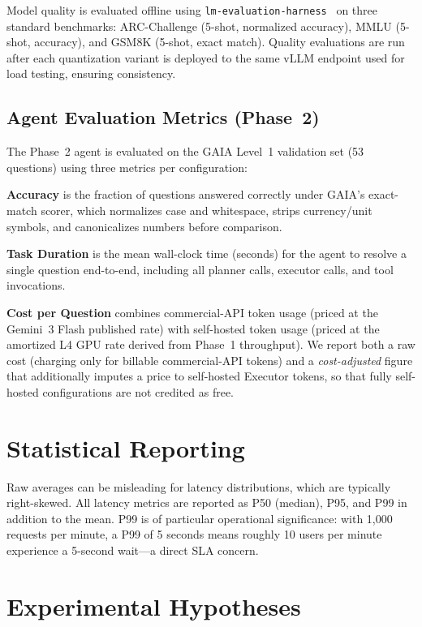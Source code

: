 \documentclass[a4paper,12pt]{report}
\begin{document}
Model quality is evaluated offline using \texttt{lm-evaluation-harness}~\cite{lmeval} on three standard benchmarks: ARC-Challenge (5-shot, normalized accuracy), MMLU (5-shot, accuracy), and GSM8K (5-shot, exact match). Quality evaluations are run after each quantization variant is deployed to the same vLLM endpoint used for load testing, ensuring consistency.

\subsection{Agent Evaluation Metrics (Phase~2)}

The Phase~2 agent is evaluated on the GAIA Level~1 validation set (53 questions) using three metrics per configuration:

\textbf{Accuracy} is the fraction of questions answered correctly under GAIA's exact-match scorer, which normalizes case and whitespace, strips currency/unit symbols, and canonicalizes numbers before comparison.

\textbf{Task Duration} is the mean wall-clock time (seconds) for the agent to resolve a single question end-to-end, including all planner calls, executor calls, and tool invocations.

\textbf{Cost per Question} combines commercial-API token usage (priced at the Gemini~3 Flash published rate) with self-hosted token usage (priced at the amortized L4 GPU rate derived from Phase~1 throughput). We report both a raw cost (charging only for billable commercial-API tokens) and a \emph{cost-adjusted} figure that additionally imputes a price to self-hosted Executor tokens, so that fully self-hosted configurations are not credited as free.

\section{Statistical Reporting}

Raw averages can be misleading for latency distributions, which are typically right-skewed. All latency metrics are reported as P50 (median), P95, and P99 in addition to the mean. P99 is of particular operational significance: with 1{,}000 requests per minute, a P99 of 5 seconds means roughly 10 users per minute experience a 5-second wait---a direct SLA concern.

\section{Experimental Hypotheses}
\end{document}
